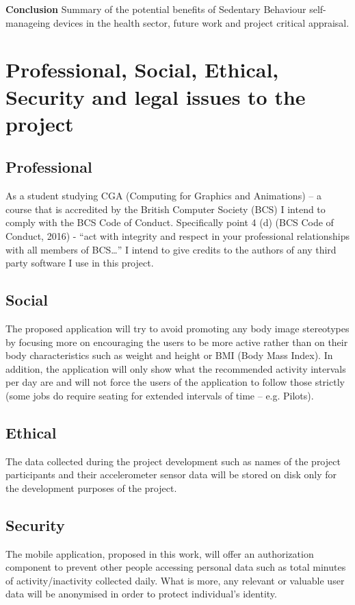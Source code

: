     
    \textbf{Conclusion} Summary of the potential benefits of Sedentary Behaviour self-manageing devices in the health sector, future work and project critical appraisal.\newline
    
    
    \section{Professional, Social, Ethical, Security and legal issues to the project}
    
    \subsection{Professional}
    As a student studying CGA (Computing for Graphics and Animations) – a course that is accredited by the British Computer Society (BCS) I intend to comply with the BCS Code of Conduct. Specifically point 4 (d) (BCS Code of Conduct, 2016) - “act with integrity and respect in your professional relationships with all members of BCS…” I intend to give credits to the authors of any third party software I use in this project.

    \subsection{Social}
    The proposed application will try to avoid promoting any body image stereotypes by focusing more on encouraging the users to be more active rather than on their body characteristics such as weight and height or BMI (Body Mass Index). In addition, the application will only show what the recommended activity intervals per day are and will not force the users of the application to follow those strictly (some jobs do require seating for extended intervals of time – e.g. Pilots).
    
    \subsection{Ethical}
    The data collected during the project development such as names of the project participants and their accelerometer sensor data will be stored on disk only for the development purposes of the project. 
    
    \subsection{Security}
    The mobile application, proposed in this work, will offer an authorization component to prevent other people accessing personal data such as total minutes of activity/inactivity collected daily. What is more, any relevant or valuable user data will be anonymised in order to protect individual’s identity.

